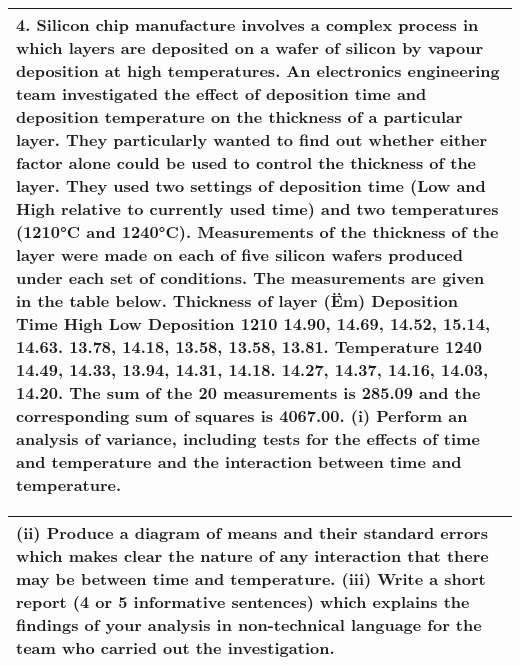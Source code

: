 \documentclass[a4paper,12pt]{article}
\begin{document}
\begin{table}[ht!]
 \centering
 \begin{tabular}{|p{15cm}|}
 \hline  
4. Silicon chip manufacture involves a complex process in which layers are deposited on a wafer of silicon by vapour deposition at high temperatures. An electronics engineering team investigated the effect of deposition time and deposition temperature on the thickness of a particular layer. They particularly wanted to find out whether either factor alone could be used to control the thickness of the layer. They used two settings of deposition time  (Low and High relative to currently used time) and two temperatures (1210°C and 1240°C). Measurements of the thickness of the layer were made on each of five silicon wafers produced under each set of conditions. The measurements are given in the table below.
Thickness of layer (Ëm)
Deposition Time High Low
Deposition
1210 14.90,  14.69,  14.52, 15.14,  14.63.
13.78,  14.18,  13.58, 13.58,  13.81.
Temperature
1240 14.49,  14.33,  13.94, 14.31,  14.18.
14.27,  14.37,  14.16, 14.03,  14.20.
The sum of the 20 measurements is 285.09 and the corresponding sum of squares is 4067.00.
(i) Perform an analysis of variance, including tests for the effects of time and temperature and the interaction between time and temperature.

\\ \hline
  \end{tabular}
\end{table}
\begin{table}[ht!]
 \centering
 \begin{tabular}{|p{15cm}|}
 \hline  
(ii) Produce a diagram of means and their standard errors which makes clear the nature of any interaction that there may be between time and temperature.
(iii) Write a short report (4 or 5 informative sentences) which explains the findings of your analysis in non-technical language for the team who carried out the investigation.\\ \hline
  \end{tabular}
\end{table}
\end{document}

